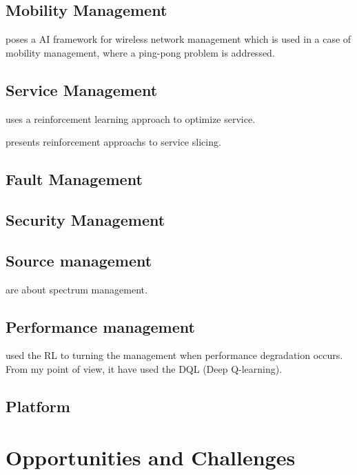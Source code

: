 \documentclass[journal,UTF8]{IEEEtran}
\begin{document}
\cite{Saleem2017Clustering}

\subsection{Mobility Management}
\cite{Cao2017AIF} poses a AI framework for wireless network management which is used in a case of mobility management, where a ping-pong problem is addressed.  


\subsection{Service Management}
\cite{Rovcanin2015Experimental} uses a reinforcement learning approach to optimize service.

\cite{Zhao2018Deep,Xianfu2018Multi} presents reinforcement approachs to service slicing. 


\subsection{Fault Management}

\cite{Rafique2018Cognitive}


\subsection{Security Management}

\cite{Zheng2016Cognitive,J2018AI}

\subsection{Source management}
\cite{Morozs2016Cognitive,L2017Primary} are about spectrum management.


\subsection{Performance management}
\cite{Kumar2002Network} used the RL to turning the management when performance degradation occurs. From my point of view, it have used the DQL (Deep Q-learning).


\subsection{Platform}
\cite{Ren2018Low}


\section{Opportunities and Challenges}
\end{document}
